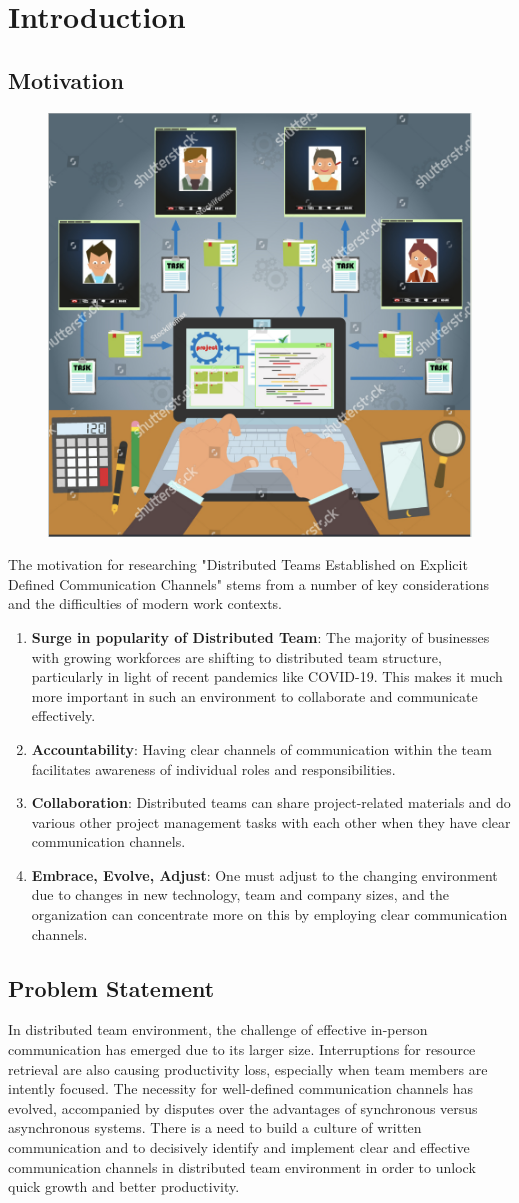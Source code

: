 \documentclass{llncs}
\begin{document}
\section{ Introduction}
\subsection{ Motivation}

\begin{figure}   
    \includegraphics[width=0.2\linewidth]{DTlogo.png}
\end{figure}

The motivation for researching "Distributed Teams Established on Explicit Defined Communication Channels" stems from a number of key considerations and the difficulties of modern work contexts. \\

\begin{enumerate}
    \item \textbf{Surge in popularity of Distributed Team}: The majority of businesses with growing workforces are shifting to distributed team structure, particularly in light of recent pandemics like COVID-19. This makes it much more important in such an environment to collaborate and communicate effectively.~\cite{refbook1}
    \item \textbf{Accountability}: Having clear channels of communication within the team facilitates awareness of individual roles and responsibilities.~\cite{refbook1}
    \item \textbf{Collaboration}: Distributed teams can share project-related materials and do various other project management tasks with each other when they have clear communication channels.~\cite{refbook1}
    \item \textbf{Embrace, Evolve, Adjust}: One must adjust to the changing environment due to changes in new technology, team and company sizes, and the organization can concentrate more on this by employing clear communication channels.~\cite{refbook1}
\end{enumerate}

\subsection{Problem Statement} In distributed team environment, the challenge of effective in-person communication has emerged due to its larger size. Interruptions for resource retrieval are also causing productivity loss, especially when team members are intently focused. The necessity for well-defined communication channels has evolved, accompanied by disputes over the advantages of synchronous versus asynchronous systems. There is a need to build a culture of written communication and to decisively identify and implement clear and effective communication channels in distributed team environment in order to unlock quick growth and better productivity.~\cite{refbook1}
\end{document}
